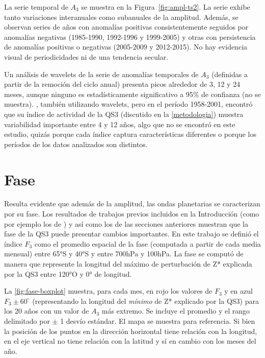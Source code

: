 \documentclass[spanish,a4paper,12pt,oneside]{book}
\begin{document}
La serie temporal de \(A_3\) se muestra en la Figura~\ref{fig:ampl-ts2}.
La serie exhibe tanto variaciones interanuales como subanuales de la
amplitud. Además, se observan series de años con anomalías positivas
consistentemente seguidos por anomalías negativas (1985-1990, 1992-1996
y 1999-2005) y otras con persistencia de anomalías positivas o negativas
(2005-2009 y 2012-2015). No hay evidencia visual de periodicidades ni de
una tendencia secular.

Un análisis de wavelets de la serie de anomalías temporales de \(A_3\)
(definidas a partir de la remoción del ciclo anual) presenta picos
alrededor de 3, 12 y 24 meses, aunque ninguno es estadísticamente
significativo a 95\% de confianza (no se muestra). \citet{Raphael2004},
también utilizando wavelets, pero en el período 1958-2001, encontró que
su índice de actividad de la QS3 (discutido en la \autoref{metodologia})
muestra variabilidad importante entre 4 y 12 años, algo que no se
encontró en este estudio, quizás porque cada índice captura
características diferentes o porque los períodos de los datos analizados
son distintos.

\hypertarget{fase}{%
\section{Fase}\label{fase}}

Resulta evidente que además de la amplitud, las ondas planetarias se
caracterizan por su fase. Los resultados de trabajos previos incluidos
en la Introducción (como por ejemplo los de \citet{Trenberth1985}) y así
como los de las secciones anteriores muestran que la fase de la QS3
puede presentar cambios importantes. En este trabajo se definió el
índice \(F_3\) como el promedio espacial de la fase (computada a partir
de cada media mensual) entre 65°S y 40°S y entre 700hPa y 100hPa. La
fase se computó de manera que represente la longitud del máximo de
perturbación de Z* explicada por la QS3 entre 120°O y 0° de longitud.

La \autoref{fig:fase-boxplot} muestra, para cada mes, en rojo los
valores de \(F_3\) y en azul \(F_3\pm 60^{\circ}\) (representando la
longitud del \emph{mínimo} de Z* explicado por la QS3) para los 20 años
con un valor de \(A_3\) más extremo. Se incluye el promedio y el rango
delimitado por \(\pm\) 1 desvío estándar. El mapa se muestra para
referencia. Si bien la posición de los puntos en la dirección horizontal
tiene relación con la longitud, en el eje vertical no tiene relación con
la latitud y sí en cambio con los meses del año.
\end{document}
